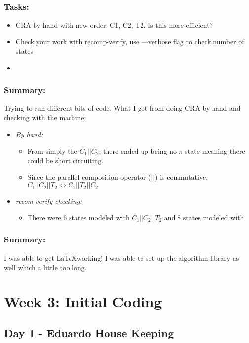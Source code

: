 \documentclass[11pt]{article}
\begin{document}
\subsubsection*{Tasks:}
\begin{itemize}
  \item CRA by hand with new order: C1, C2, T2. Is this more efficient?
  \item Check your work with recomp-verify, use —verbose flag to check number of states
  \item 
\end{itemize}

\subsubsection*{Summary:}
Trying to run different bits of code. What I got from doing CRA by hand and checking with the machine:
\begin{itemize}
  \item \emph{By hand:}
  \begin{itemize}
    \item From simply the $C_1 || C_2$, there ended up being no $\pi$ state meaning there could be short circuiting.
    \item Since the parallel composition operator ($||$) is commutative, $C_1||C_2||T_2 \Leftrightarrow C_1||T_2||C_2$
  \end{itemize}
  \item \emph{\emph{recom-verify checking:}}
  \begin{itemize}
    \item There were 6 states modeled with $C_1||C_2||T_2$ and 8 states modeled with 
  \end{itemize}
\end{itemize}

\subsubsection*{Summary:}
I was able to get \LaTeX working! I was able to set up the algorithm library as well
which a little too long.



\section{Week 3: Initial Coding}
\subsection{Day 1 - Eduardo House Keeping}
\end{document}
